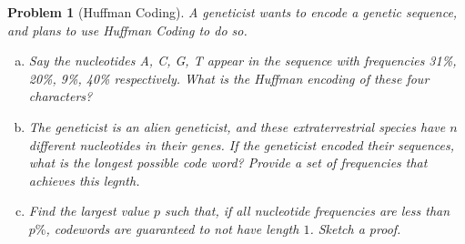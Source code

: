 \documentclass[10pt]{article}
\newtheorem{problem}{\sc\color{cit}Problem}
\begin{document}
\newpage


\begin{problem}[Huffman Coding]
A geneticist wants to encode a genetic sequence, and plans to use Huffman Coding to do so. 
\begin{enumerate}[(a)]
    \item Say the nucleotides A, C, G, T appear in the sequence with frequencies 31\%, 20\%, 9\%, 40\% respectively. What is the Huffman encoding of these four characters?
    \item The geneticist is an alien geneticist, and these extraterrestrial species have $n$ different nucleotides in their genes. If the geneticist encoded their sequences, what is the longest possible code word? Provide a set of frequencies that achieves this legnth.  
    \item Find the largest value $p$ such that, if all nucleotide frequencies are less than $p\%$, codewords are \textit{guaranteed} to not have length $1$. Sketch a proof.
\end{enumerate}

\end{problem}
\end{document}
